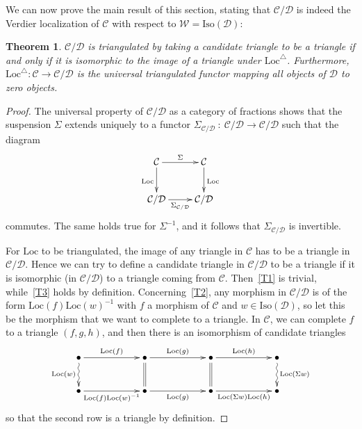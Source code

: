 \documentclass{amsproc}
\newtheorem{thm}[prop]{Theorem}
\theoremstyle{definition}
\begin{document}
We can now prove the main result of this section, stating that ${\mathcal{C}}/{\mathcal{D}}$ is indeed the Verdier localization of ${\mathcal{C}}$ with respect to ${\mathcal{W}}={\mathrm{Iso}}({\mathcal{D}})$:

\begin{thm}
\label{loc}
${\mathcal{C}}/{\mathcal{D}}$ is triangulated by taking a candidate triangle to be a triangle if and only if it is isomorphic to the image of a triangle under ${\mathrm{Loc}}^\triangle$. Furthermore, ${\mathrm{Loc}}^\triangle:{\mathcal{C}}{\longrightarrow}{\mathcal{C}}/{\mathcal{D}}$ is the universal triangulated functor mapping all objects of ${\mathcal{D}}$ to zero objects.
\end{thm}

\begin{proof}
The universal property of ${\mathcal{C}}/{\mathcal{D}}$ as a category of fractions shows that the suspension $\Sigma$ extends uniquely to a functor $\Sigma_{{\mathcal{C}}/{\mathcal{D}}}\: : \: {\mathcal{C}}/{\mathcal{D}}{\longrightarrow} {\mathcal{C}}/{\mathcal{D}}$ such that the diagram
\begin{displaymath}
\xymatrix{{\mathcal{C}}\ar[d]_{\mathrm{Loc}}\ar[r]^\Sigma & {\mathcal{C}}\ar[d]^{\mathrm{Loc}}\\
{{\mathcal{C}}/{\mathcal{D}}}\ar[r]_{\Sigma_{{\mathcal{C}}/{\mathcal{D}}}} & {{\mathcal{C}}/{\mathcal{D}}}}
\end{displaymath}
commutes. The same holds true for $\Sigma^{-1}$, and it follows that $\Sigma_{{\mathcal{C}}/{\mathcal{D}}}$ is invertible. 

For ${\mathrm{Loc}}$ to be triangulated, the image of any triangle in ${\mathcal{C}}$ has to be a triangle in ${\mathcal{C}}/{\mathcal{D}}$. Hence we can try to define a candidate triangle in ${\mathcal{C}}/{\mathcal{D}}$ to be a triangle if it is isomorphic (in ${\mathcal{C}}/{\mathcal{D}}$) to a triangle coming from ${\mathcal{C}}$. Then~\ref{T1} is trivial, while~\ref{T3} holds by definition. Concerning~\ref{T2}, any morphism in ${\mathcal{C}}/{\mathcal{D}}$ is of the form ${\mathrm{Loc}}(f){\mathrm{Loc}}(w)^{-1}$ with $f$ a morphism of ${\mathcal{C}}$ and $w\in{\mathrm{Iso}}({\mathcal{D}})$, so let this be the morphism that we want to complete to a triangle. In ${\mathcal{C}}$, we can complete $f$ to a triangle $(f,g,h)$, and then there is an isomorphism of candidate triangles
\begin{displaymath}
\xymatrix@!C@C+33pt{{\bullet}\ar@{~>}[d]_{{\mathrm{Loc}}(w)}\ar[r]^{{\mathrm{Loc}}(f)} & {\bullet}\ar@{=}[d]\ar[r]^{{\mathrm{Loc}}(g)} & {\bullet}\ar@{=}[d]\ar[r]^{{\mathrm{Loc}}(h)} & {\bullet}\ar@{~>}[d]^{{\mathrm{Loc}}(\Sigma w)}\\
{\bullet}\ar[r]_{{\mathrm{Loc}}(f){\mathrm{Loc}}(w)^{-1}} & {\bullet}\ar[r]_{{\mathrm{Loc}}(g)} & {\bullet}\ar[r]_{{\mathrm{Loc}}(\Sigma w){\mathrm{Loc}}(h)} & {\bullet}}
\end{displaymath}
so that the second row is a triangle by definition.


\end{proof}
\end{document}

